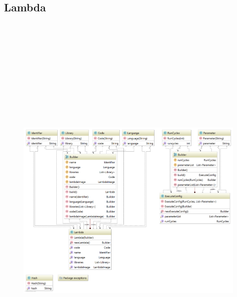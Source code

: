 \documentclass[a4paper,20pt,oneside]{book}
\begin{document}
    \subsection{Lambda}
	    \begin{figure}[!hb]
	    	\includegraphics[width=18cm,height=20cm]{lambdadiagram}
	    \end{figure}
\end{document}

